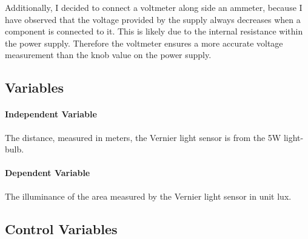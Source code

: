 \documentclass[a4paper,12pt]{article}
\begin{document}

Additionally, I decided to connect a voltmeter along side an ammeter, because I have observed that the voltage provided by the supply always decreases when a component is connected to it. This is likely due to the internal resistance within the power supply. Therefore the voltmeter ensures a more accurate voltage measurement than the knob value on the power supply.


\subsection{Variables}
\paragraph{Independent Variable}
The distance, measured in meters, the Vernier light sensor is from the 5W light-bulb.

\paragraph{Dependent Variable}
The illuminance of the area measured by the Vernier light sensor in unit lux.

\subsection{Control Variables}
\end{document}
